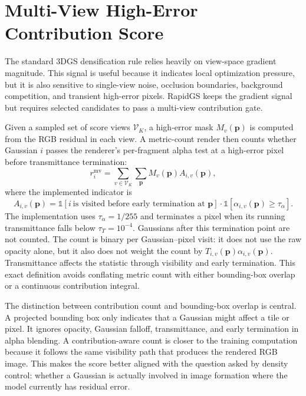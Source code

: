 \section{Multi-View High-Error Contribution Score}

The standard 3DGS densification rule relies heavily on view-space gradient magnitude. This signal is useful because it indicates local optimization pressure, but it is also sensitive to single-view noise, occlusion boundaries, background competition, and transient high-error pixels. RapidGS keeps the gradient signal but requires selected candidates to pass a multi-view contribution gate.

Given a sampled set of score views $\mathcal{V}_K$, a high-error mask $M_v(\mathbf{p})$ is computed from the RGB residual in each view. A metric-count render then counts whether Gaussian $i$ passes the renderer's per-fragment alpha test at a high-error pixel before transmittance termination:
\begin{equation}
r_i^{\mathrm{mv}}
=
\sum_{v\in\mathcal{V}_K}
\sum_{\mathbf{p}}
M_v(\mathbf{p})A_{i,v}(\mathbf{p}),
\end{equation}
where the implemented indicator is
\begin{equation}
A_{i,v}(\mathbf{p})
=
\mathbb{1}\!\left[
i\ \text{is visited before early termination at }\mathbf{p}
\right]
\cdot
\mathbb{1}\!\left[
\alpha_{i,v}(\mathbf{p})\ge\tau_\alpha
\right].
\end{equation}
The implementation uses $\tau_\alpha=1/255$ and terminates a pixel when its running transmittance falls below $\tau_T=10^{-4}$. Gaussians after this termination point are not counted. The count is binary per Gaussian--pixel visit: it does not use the raw opacity alone, but it also does not weight the count by $T_{i,v}(\mathbf{p})\alpha_{i,v}(\mathbf{p})$. Transmittance affects the statistic through visibility and early termination. This exact definition avoids conflating metric count with either bounding-box overlap or a continuous contribution integral.

The distinction between contribution count and bounding-box overlap is central. A projected bounding box only indicates that a Gaussian might affect a tile or pixel. It ignores opacity, Gaussian falloff, transmittance, and early termination in alpha blending. A contribution-aware count is closer to the training computation because it follows the same visibility path that produces the rendered RGB image. This makes the score better aligned with the question asked by density control: whether a Gaussian is actually involved in image formation where the model currently has residual error.

